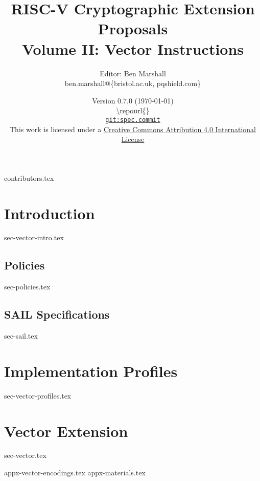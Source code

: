 \documentclass[11pt]{article}
\title{RISC-V Cryptographic Extension Proposals\\Volume II: Vector Instructions}
\author{Editor: Ben Marshall\\ben.marshall@\{bristol.ac.uk, pqshield.com\}}
\date{Version $0.7.0$ (\today) \\
\medskip
\url{\repourl{}} \\
\href{\repourl{}}{
{\small \tt git:{spec.commit}}} \\
\bigskip
{\small
This work is licensed under a
\href{http://creativecommons.org/licenses/by/4.0/}{Creative Commons Attribution 4.0 International License}
}
}
\begin{document}

\maketitle

{contributors.tex}

\tableofcontents




\newpage
\section{Introduction}
\label{sec:intro}
{sec-vector-intro.tex}

\subsection{Policies}
{sec-policies.tex}

\subsection{SAIL Specifications}
\label{sec:sail}
{sec-sail.tex}

\newpage
\section{Implementation Profiles}
\label{sec:profiles}
{sec-vector-profiles.tex}

\newpage
\section{Vector Extension}
\label{sec:vector}
{sec-vector.tex}


\newpage
\printbibliography


%
%

\newpage
\begin{appendices}
\label{sec:appendix}
{appx-vector-encodings.tex}
{appx-materials.tex}
\end{appendices}

\end{document}
